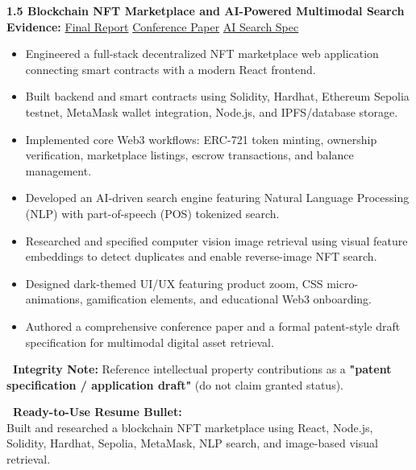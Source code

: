 \documentclass[10pt,a4paper]{article}
\newcommand{\statuscompleted}{\tcbox[on line, colback=completedbg, colframe=completed!50!white, size=small, arc=2pt, boxrule=0.5pt]{\scriptsize\bfseries\color{completed}\faIcon{check-circle}\ COMPLETED / SUBSTANTIAL}}
\begin{document}
\begin{projectcard}
  \textbf{\large 1.5 Blockchain NFT Marketplace and AI-Powered Multimodal Search} \hfill \statuscompleted\\[2pt]
  {\footnotesize\color{textmuted}\textbf{Evidence:} \underline{Final Report} \quad\textbar\quad \underline{Conference Paper} \quad\textbar\quad \underline{AI Search Spec}}
  \begin{itemize}[leftmargin=14pt, itemsep=1.5pt, topsep=2pt]
    \item Engineered a full-stack decentralized NFT marketplace web application connecting smart contracts with a modern React frontend.
    \item Built backend and smart contracts using Solidity, Hardhat, Ethereum Sepolia testnet, MetaMask wallet integration, Node.js, and IPFS/database storage.
    \item Implemented core Web3 workflows: ERC-721 token minting, ownership verification, marketplace listings, escrow transactions, and balance management.
    \item Developed an AI-driven search engine featuring Natural Language Processing (NLP) with part-of-speech (POS) tokenized search.
    \item Researched and specified computer vision image retrieval using visual feature embeddings to detect duplicates and enable reverse-image NFT search.
    \item Designed dark-themed UI/UX featuring product zoom, CSS micro-animations, gamification elements, and educational Web3 onboarding.
    \item Authored a comprehensive conference paper and a formal patent-style draft specification for multimodal digital asset retrieval.
  \end{itemize}
  \begin{metricsbox}[colback=prototypebg!35!white, colframe=prototype!50!white, fontupper=\footnotesize\color{prototype!90!black}]
    \textbf{\ Integrity Note:} Reference intellectual property contributions as a \textbf{"patent specification / application draft"} (do not claim granted status).
  \end{metricsbox}
  \begin{resumebox}
    \textbf{\color{accent}\ Ready-to-Use Resume Bullet:}\\
    Built and researched a blockchain NFT marketplace using React, Node.js, Solidity, Hardhat, Sepolia, MetaMask, NLP search, and image-based visual retrieval.
  \end{resumebox}
\end{projectcard}
\end{document}
